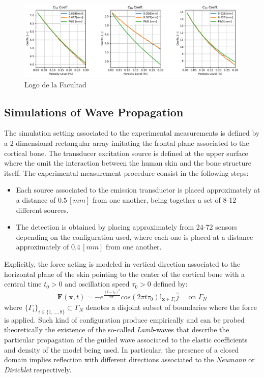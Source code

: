 \begin{figure}[!h]
	\centering
	\includegraphics[scale=.5]{images/CellsProb/CellProb_OthersHomCoeffsCircularHexa.pdf}
	\caption{Logo de la Facultad}
	\label{klojhgjha}
\end{figure}

\subsection{Simulations of Wave Propagation}

The simulation setting associated to the experimental measurements is defined by a 2-dimensional rectangular array imitating the frontal plane associated to the cortical bone. The transducer excitation source is defined at the upper surface where the omit the interaction between the human skin and the bone structure itself. 
The experimental measurement procedure consist in the following steps:
\begin{itemize}
    \item Each source associated to the emission transductor is placed approximately at a distance of $0.5 \, [mm]$ from one another, being together a set of 8-12 different sources. 
    \item The detection is obtained by placing approximately from 24-72 sensors depending on the configuration used, where each one is placed at a distance approximately of $0.4 \, [mm]$ from one another.
\end{itemize}
Explicitly, the force acting is modeled in vertical direction associated to the horizontal plane of the skin pointing to the center of the cortical bone with a central time $t_0 > 0$ and oscillation speed $\tau_0 > 0$ defined by:
\begin{equation}
    \mathbf{F}(\mathbf{x},t) = - e^{\frac{(t-t_0)^2}{2\sigma^2}} cos( 2 \pi t \tau_0 ) \mathbb{I}_{\mathbf{x} \in \Gamma_i} \hat{j} \quad \text{ on } \Gamma_N
\end{equation}
where $\{ \Gamma_i\}_{ i \in \{1,\dots, 8\}} \subset \Gamma_N$ denotes a disjoint subset of boundaries where the force is applied. 
Such kind of configuration produce empirically and can be probed theoretically the existence of the so-called \textit{Lamb}-waves that describe the particular propagation of the guided wave associated to the elastic coefficients and density of the model being used.
In particular, the presence of a closed domain implies reflection with different directions associated to the \textit{Neumann} or \textit{Dirichlet} respectively.

